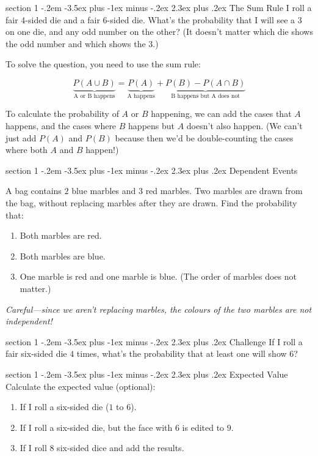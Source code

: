 \documentclass[12pt,letterpaper]{article}
\makeatletter
\newenvironment{problem}{\@startsection
       {section}
       {1}
       {-.2em}
       {-3.5ex plus -1ex minus -.2ex}
       {2.3ex plus .2ex}
       {\pagebreak[3]
       \large\bf\noindent{Problem }
       }
       }
\makeatother
\begin{document}
\begin{problem}{The Sum Rule}
 I roll a fair 4-sided die and a fair 6-sided die. What's the probability that I will see a $3$ on one die, and any odd number
 on the other?
 (It doesn't matter which die shows the odd number and which shows the $3$.)
 
 To solve the question, you need to use the sum rule:
 
 \begin{equation*}
  \underbrace{P(A \cup B)}_\text{A or B happens}
  = \underbrace{P(A)}_\text{A happens} + \underbrace{P(B) - P(A \cap B)}_\text{B happens but A does not}
 \end{equation*}
 
 To calculate the probability of $A$ or $B$ happening, we can add the cases that $A$ happens,
 and the cases where $B$ happens but $A$ doesn't also happen. (We can't just add $P(A)$ and $P(B)$
 because then we'd be double-counting the cases where both $A$ and $B$ happen!)
\end{problem}

\begin{problem}{Dependent Events}

 A bag contains $2$ blue marbles and $3$ red marbles. Two marbles are drawn from the bag, without replacing marbles
 after they are drawn. Find the probability that:
 
 \begin{enumerate}[\hspace{.5cm}a.]
  \item Both marbles are red.
  \item Both marbles are blue.
  \item One marble is red and one marble is blue. (The order of marbles does not matter.)
 \end{enumerate}
 
 \emph{Careful---since we aren't replacing marbles, the colours of the two marbles are not independent!}
\end{problem}

\begin{problem}{Challenge}
 If I roll a fair six-sided die $4$ times, what's the probability that at least one will show $6$?
\end{problem}

\begin{problem}{Expected Value}
Calculate the expected value (optional):

 \begin{enumerate}[\hspace{.5cm}a.]
  \item If I roll a six-sided die ($1$ to $6$).
  \item If I roll a six-sided die, but the face with $6$ is edited to $9$.
  \item If I roll $8$ six-sided dice and add the results.
 \end{enumerate}
\end{problem}
\end{document}
